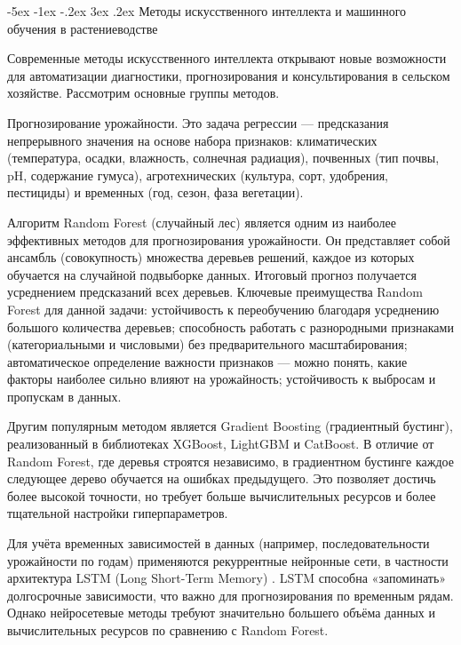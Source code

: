 \documentclass[14pt, a4paper]{extarticle}
\makeatletter
\renewcommand\subsection{\@startsection {subsection}{2}{\z@}%
    {-5ex \@plus -1ex \@minus -.2ex}%
    {3ex \@plus.2ex}%
    {\centering\large\bfseries}}
\makeatother
\begin{document}
\subsection{Методы искусственного интеллекта и машинного обучения в растениеводстве}

    Современные методы искусственного интеллекта открывают новые возможности для автоматизации диагностики, прогнозирования и консультирования в сельском хозяйстве. Рассмотрим основные группы методов.

    Прогнозирование урожайности. Это задача регрессии — предсказания непрерывного значения на основе набора признаков: климатических (температура, осадки, влажность, солнечная радиация), почвенных (тип почвы, pH, содержание гумуса), агротехнических (культура, сорт, удобрения, пестициды) и временных (год, сезон, фаза вегетации).

    Алгоритм Random Forest (случайный лес) \cite{randomforest} является одним из наиболее эффективных методов для прогнозирования урожайности. Он представляет собой ансамбль (совокупность) множества деревьев решений, каждое из которых обучается на случайной подвыборке данных. Итоговый прогноз получается усреднением предсказаний всех деревьев. Ключевые преимущества Random Forest для данной задачи: устойчивость к переобучению благодаря усреднению большого количества деревьев; способность работать с разнородными признаками (категориальными и числовыми) без предварительного масштабирования; автоматическое определение важности признаков — можно понять, какие факторы наиболее сильно влияют на урожайность; устойчивость к выбросам и пропускам в данных.

    Другим популярным методом является Gradient Boosting (градиентный бустинг), реализованный в библиотеках XGBoost, LightGBM и CatBoost. В отличие от Random Forest, где деревья строятся независимо, в градиентном бустинге каждое следующее дерево обучается на ошибках предыдущего. Это позволяет достичь более высокой точности, но требует больше вычислительных ресурсов и более тщательной настройки гиперпараметров.

    Для учёта временных зависимостей в данных (например, последовательности урожайности по годам) применяются рекуррентные нейронные сети, в частности архитектура LSTM (Long Short-Term Memory) \cite{lstm}. LSTM способна «запоминать» долгосрочные зависимости, что важно для прогнозирования по временным рядам. Однако нейросетевые методы требуют значительно большего объёма данных и вычислительных ресурсов по сравнению с Random Forest.
\end{document}
